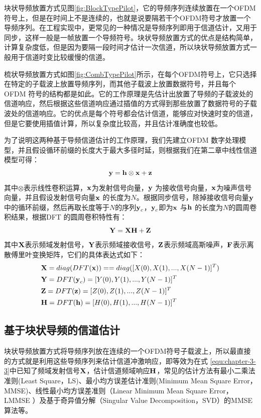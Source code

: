 块状导频放置方式见图\ref{fig:BlockTypePilot}，它的导频序列连续放置在一个OFDM符号上，但是在时间上不是连续的，也就是说要隔若干个OFDM符号才放置一个导频序列。在工程实现中，更常见的一种情况是导频序列即用于信道估计，又用于同步，这样一般是一帧放置一个导频符号。块状导频放置方式的优点是结构简单，计算复杂度低，但是因为要隔一段时间才估计一次信道，所以块状导频放置方式一般用于信道时变比较缓慢的信道。

梳状导频放置方式如图\ref{fig:CombTypePilot}所示，在每个OFDM符号上，它只选择在特定的子载波上放置导频序列，而其他子载波上放置数据符号，并且每个OFDM 符号的结构都是如此。它的工作原理是先估计出放置了导频的子载波处的信道响应，然后根据这些信道响应通过插值的方式得到那些放置了数据符号的子载波处的信道响应。它的优点是每个符号都会估计信道，能够应对快速时变的信道，但是它要使用插值计算，所以复杂度比较高，并且估计准确度也较低。

为了说明这两种基于导频信道估计的工作原理，我们先建立OFDM 数字处理模型，并且假设循环前缀的长度大于最大多径时延，则根据我们在第二章中线性信道模型可得：
\begin{equation}
\bf y=h\otimes x+z
\label{equ:time-domain signal}
\end{equation}
其中$\otimes$表示线性卷积运算，$\textbf x$为发射信号向量，$\textbf y$ 为接收信号向量，$\textbf x$为噪声信号向量，并且假设发射信号向量$\textbf x$ 的长度为$N$。根据同步信号，除掉接收信号向量$\textbf y$中的循环前缀，然后再取长度等于$N$的序列$\textbf y_c$，$\textbf y_c$即为$\textbf x$ 与$\textbf h$ 的长度为$N$的圆周卷积结果，根据DFT 的圆周卷积特性有：
\begin{equation}
\bf Y=XH+Z
\label{equ:chapter-3-3}
\end{equation}
其中$\textbf X$表示频域发射信号，$\textbf Y$表示频域接收信号，$\textbf Z$表示频域高斯噪声，$\textbf F$表示离散傅里叶变换矩阵，它们的具体表达式如下：
\begin{equation}
\begin{aligned}
&\textbf X=diag(DFT(\textbf x))==diag([ X(0), X(1),..., X(N-1)]^T)\\
&\textbf Y=DFT(\textbf y_c) =[ Y(0), Y(1),..., Y(N-1)]^{T} \\
&\textbf Z=DFT(\textbf z) =[ Z(0), Z(1),..., Z(N-1)]^{T} \\
&\textbf H=DFT(\textbf h) =[ H(0), H(1),..., H(N-1)]^{T} \\
\end{aligned}
\end{equation}
\subsection{基于块状导频的信道估计}
块状导频放置方式将导频序列放在连续的一个OFDM符号子载波上，所以最直接的方式就是利用这些导频序列来估计信道冲激响应，即等效为在式
\ref{equ:chapter-3-3}中已知了频域发射信号$\textbf X$，估计信道频域响应$\textbf H$，常见的估计方法有最小二乘法准则(Least Square，LS)、最小均方误差估计准则(Minimum Mean Square Error，MMSE)、线性最小均方误差准则（Linear Minimum Mean Square Error，LMMSE ）及基于奇异值分解（Singular Value Decomposition，SVD）的MMSE算法等。
